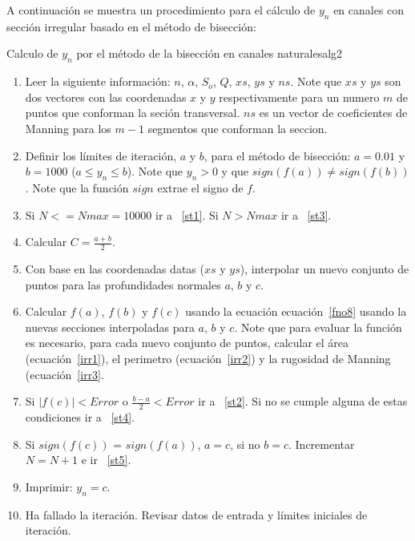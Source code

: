 \documentclass[11pt, oneside]{article}
\begin{document}
A continuaci\'on se muestra un procedimiento para el c\'alculo de $y_n$ en canales con secci\'on irregular basado en el m\'etodo de bisecci\'on:
\begin{alg}{Calculo de $y_n$ por el m\'etodo de la bisecci\'on en canales naturales}{alg2}
\begin{enumerate}
\item Leer la siguiente informaci\'on: $n$, $\alpha$, $S_o$, $Q$, $xs$, $ys$ y $ns$. Note que $xs$ y $ys$ son dos vectores con las coordenadas $x$ y $y$ respectivamente para un numero $m$ de puntos que conforman la seci\'on transversal. $ns$ es un vector de coeficientes de Manning para los $m-1$ segmentos que conforman la seccion.

\item Definir los l\'imites de iteraci\'on, $a$ y $b$, para el m\'etodo de bisecci\'on: $a = 0.01$ y $b=1000$ ($a \le y_n \le b$). Note que $y_n > 0$ y que $sign(f(a)) \neq sign(f(b)) $. Note que la funci\'on $sign$ extrae el signo de $f$.

\item \label{st5} Si $N <= Nmax=10000$ ir a ~\ref{st1}. Si $N > Nmax$ ir a ~\ref{st3}.  
\item \label{st1} Calcular $C = \frac{a+b}{2}$.
\item Con base en las coordenadas datas ($xs$ y $ys$), interpolar un nuevo conjunto de puntos para las profundidades normales $a$, $b$ y $c$.   
\item Calcular $f(a)$, $f(b)$ y $f(c)$ usando la ecuaci\'on ecuaci\'on~\ref{fno8} usando la nuevas secciones interpoladas para $a$, $b$ y $c$. Note que para evaluar la funci\'on es necesario, para cada nuevo conjunto de puntos, calcular el \'area (ecuaci\'on~\ref{irr1}), el perimetro (ecuaci\'on~\ref{irr2}) y la rugosidad de Manning (ecuaci\'on~\ref{irr3}.
\item Si $|f(c)|< Error$ o $\frac{b-a}{2} < Error$ ir a ~\ref{st2}. Si no se cumple alguna de estas  condiciones ir a ~\ref{st4}.

\item \label{st4} Si $sign(f(c))$ = $sign(f(a))$, $a=c$, si no $b=c$. Incrementar $N=N+1$ e ir ~\ref{st5}. 

\item \label{st2} Imprimir: $y_n = c$.
\item \label{st3} Ha fallado la iteraci\'on. Revisar datos de entrada y l\'imites iniciales de iteraci\'on.
\end{enumerate}
\end{alg}
\end{document}
